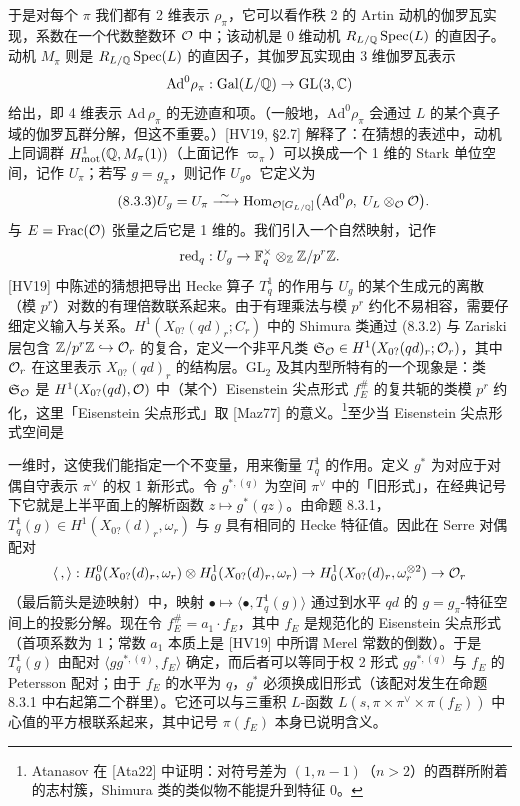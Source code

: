 于是对每个 $\pi$ 我们都有 2 维表示 $\rho_\pi$，它可以看作秩 2 的 Artin 动机的伽罗瓦实现，系数在一个代数整数环 $\mathcal{O}$ 中；该动机是 0 维动机 $R_{L/\mathbb{Q}}\operatorname{Spec}(L)$ 的直因子。动机 $M_\pi$ 则是 $R_{L/\mathbb{Q}}\operatorname{Spec}(L)$ 的直因子，其伽罗瓦实现由 3 维伽罗瓦表示
\[
\mathrm{Ad}^0\rho_\pi:\operatorname{Gal}(L/\mathbb{Q})\to\mathrm{GL}(3,\mathbb{C})
\]
给出，即 4 维表示 $\mathrm{Ad}\,\rho_\pi$ 的无迹直和项。（一般地，$\mathrm{Ad}^0\rho_\pi$ 会通过 $L$ 的某个真子域的伽罗瓦群分解，但这不重要。）[HV19, §2.7] 解释了：在猜想的表述中，动机上同调群 $H^1_{\mathrm{mot}}(\mathbb{Q},M_\pi(1))$（上面记作 $\varpi_\pi$）可以换成一个 1 维的 Stark 单位空间，记作 $U_\pi$；若写 $g=g_\pi$，则记作 $U_g$。它定义为
\begin{equation}\tag{8.3.3}\label{eq:a6-05-11}
U_g=U_\pi\xrightarrow{\ \sim\ }\operatorname{Hom}_{\mathcal{O}[G_{L/\mathbb{Q}}]}\bigl(\mathrm{Ad}^0\rho,\;U_L\otimes_{\mathcal{O}}\mathcal{O}\bigr).
\end{equation}
与 $E=\mathrm{Frac}(\mathcal{O})$ 张量之后它是 1 维的。我们引入一个自然映射，记作
\[
\mathrm{red}_q:U_g\to\mathbb{F}_q^\times\otimes_{\mathbb{Z}}\mathbb{Z}/p^r\mathbb{Z}.
\]
[HV19] 中陈述的猜想把导出 Hecke 算子 $T^1_q$ 的作用与 $U_g$ 的某个生成元的离散（模 $p^r$）对数的有理倍数联系起来。由于有理乘法与模 $p^r$ 约化不易相容，需要仔细定义输入与关系。$H^1(X_{0?}(qd)_r;C_r)$ 中的 Shimura 类通过 (8.3.2) 与 Zariski 层包含 $\mathbb{Z}/p^r\mathbb{Z}\hookrightarrow\mathcal{O}_r$ 的复合，定义一个非平凡类 $\mathfrak S_{\mathcal{O}}\in H^1(X_{0?}(qd)_r;\mathcal{O}_r)$，其中 $\mathcal{O}_r$ 在这里表示 $X_{0?}(qd)_r$ 的结构层。$\mathrm{GL}_2$ 及其内型所特有的一个现象是：类 $\mathfrak S_{\mathcal{O}}$ 是 $H^1(X_{0?}(qd),\mathcal{O})$ 中（某个）Eisenstein 尖点形式 $f^{\#}_E$ 的复共轭的类模 $p^r$ 约化，这里「Eisenstein 尖点形式」取 [Maz77] 的意义。\footnote{Atanasov 在 [Ata22] 中证明：对符号差为 $(1,n-1)$（$n>2$）的酉群所附着的志村簇，Shimura 类的类似物不能提升到特征 0。}至少当 Eisenstein 尖点形式空间是

一维时，这使我们能指定一个不变量，用来衡量 $T^1_q$ 的作用。定义 $g^*$ 为对应于对偶自守表示 $\pi^\vee$ 的权 1 新形式。令 $g^{*,(q)}$ 为空间 $\pi^\vee$ 中的「旧形式」，在经典记号下它就是上半平面上的解析函数 $z\mapsto g^*(qz)$。由命题 8.3.1，$T^1_q(g)\in H^1(X_{0?}(d)_r,\omega_r)$ 与 $g$ 具有相同的 Hecke 特征值。因此在 Serre 对偶配对
\[
\langle\,,\rangle:H^0_0(X_{0?}(d)_r,\omega_r)\otimes H^1_0(X_{0?}(d)_r,\omega_r)\to H^1_0(X_{0?}(d)_r,\omega_r^{\otimes2})\to\mathcal{O}_r
\]
（最后箭头是迹映射）中，映射 $\bullet\mapsto\langle\bullet,T^1_q(g)\rangle$ 通过到水平 $qd$ 的 $g=g_\pi$-特征空间上的投影分解。现在令 $f^{\#}_E=a_1\cdot f_E$，其中 $f_E$ 是规范化的 Eisenstein 尖点形式（首项系数为 1；常数 $a_1$ 本质上是 [HV19] 中所谓 Merel 常数的倒数）。于是 $T^1_q(g)$ 由配对 $\langle gg^{*,(q)},f_E\rangle$ 确定，而后者可以等同于权 2 形式 $gg^{*,(q)}$ 与 $f_E$ 的 Petersson 配对；由于 $f_E$ 的水平为 $q$，$g^*$ 必须换成旧形式（该配对发生在命题 8.3.1 中右起第二个群里）。它还可以与三重积 $L$-函数 $L(s,\pi\times\pi^\vee\times\pi(f_E))$ 中心值的平方根联系起来，其中记号 $\pi(f_E)$ 本身已说明含义。

